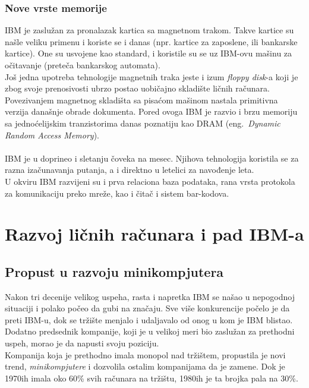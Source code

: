 \documentclass[a4paper]{article}
\begin{document}
\subsubsection*{Nove vrste memorije}
IBM je zaslužan za pronalazak kartica sa magnetnom trakom. Takve kartice su našle veliku primenu i koriste se i danas (npr. kartice za zaposlene, ili bankarske kartice). One su usvojene kao standard, i koristile su se uz IBM-ovu mašinu za očitavanje (preteča bankarskog automata).\\
Još jedna upotreba tehnologije magnetnih traka jeste i izum \emph{floppy disk}-a koji je zbog svoje prenosivosti ubrzo postao uobičajno skladište ličnih računara.\\ Povezivanjem magnetnog skladišta sa pisaćom mašinom nastala primitivna verzija današnje obrade dokumenta.
Pored ovoga IBM je razvio i brzu memoriju sa jednoćelijskim tranzistorima danas poznatiju kao DRAM (eng.~{\em Dynamic Random Access Memory}).%
\\ \\
IBM je u doprineo i sletanju čoveka na mesec. Njihova tehnologija koristila se za razna izačunavanja putanja, a i direktno u letelici za navođenje leta.\\
U okviru IBM razvijeni su i prva relaciona baza podataka, rana vrsta protokola za komunikaciju preko mreže, kao i čitač i sistem bar-kodova.
%
\section{Razvoj ličnih računara i pad IBM-a}
\subsection{Propust u razvoju minikompjutera}
Nakon tri decenije velikog uspeha, rasta i napretka IBM se našao u nepogodnoj situaciji i polako počeo da gubi na značaju. %
Sve više konkurencije počelo je da preti IBM-u, dok se tržište menjalo i udaljavalo od onog u kom je IBM blistao. Dodatno predsednik kompanije, koji je u velikoj meri bio zaslužan za prethodni uspeh, morao je da napusti svoju poziciju.\\%
Kompanija koja je prethodno imala monopol nad tržištem, propustila je novi trend, \emph{minikompjutere} i dozvolila ostalim kompanijama da je zamene. Dok je 1970ih imala oko 60\% svih računara na tržištu, 1980ih je ta brojka pala na 30\%. %
\end{document}
